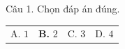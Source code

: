 \documentclass[12pt]{article}
\begin{document}
Câu 1. Chọn đáp án đúng.

\begin{tabularx}{\textwidth}{XXXX}
A. $1$ & \textbf{B.} $2$ & C. $3$ & D. $4$
\end{tabularx}
\end{document}

